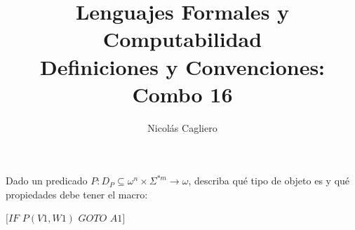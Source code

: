 \documentclass{article}
\title{Lenguajes Formales y Computabilidad \\
        \large Definiciones y Convenciones: Combo 16 }
\author{Nicolás Cagliero}
\begin{document}
\maketitle

Dado un predicado $P : D_P \subseteq \omega^n \times \Sigma^{*m} \rightarrow \omega$,
describa qué tipo de objeto es y qué propiedades debe tener el macro:
\begin{center}
    $[IF$ $P(V1, W1)$ $GOTO$ $A1]$
\end{center}
\end{document}
